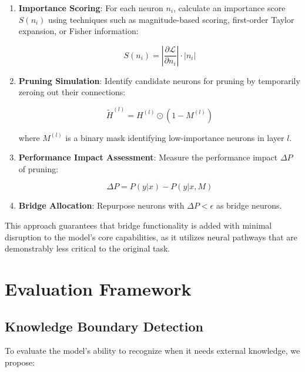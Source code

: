 \documentclass[9pt,a4paper,twocolumn,twoside]{tau-class/tau}
\begin{document}
    \begin{enumerate}
        \item \textbf{Importance Scoring}: For each neuron $n_i$, calculate an importance score $S(n_i)$ using techniques such as magnitude-based scoring, first-order Taylor expansion, or Fisher information:

        \begin{equation}
        S(n_i) = \left|\frac{\partial \mathcal{L}}{\partial n_i}\right| \cdot |n_i|
        \end{equation}

        \item \textbf{Pruning Simulation}: Identify candidate neurons for pruning by temporarily zeroing out their connections:

        \begin{equation}
        \tilde{H}^{(l)} = H^{(l)} \odot (1 - M^{(l)})
        \end{equation}

        where $M^{(l)}$ is a binary mask identifying low-importance neurons in layer $l$.

        \item \textbf{Performance Impact Assessment}: Measure the performance impact $\Delta P$ of pruning:

        \begin{equation}
        \Delta P = P(y|x) - P(y|x, M)
        \end{equation}

        \item \textbf{Bridge Allocation}: Repurpose neurons with $\Delta P < \epsilon$ as bridge neurons.
    \end{enumerate}

    This approach guarantees that bridge functionality is added with minimal disruption to the model's core capabilities, as it utilizes neural pathways that are demonstrably less critical to the original task.

\section{Evaluation Framework}

\subsection{Knowledge Boundary Detection}

    To evaluate the model's ability to recognize when it needs external knowledge, we propose:
\end{document}
